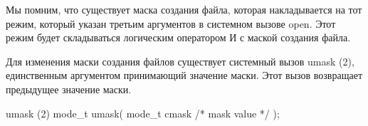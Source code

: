 Мы помним, что существует маска создания файла, которая накладывается на тот режим, который указан третьим аргументов в системном вызове open. Этот режим будет складываться логическим оператором И с маской создания файла. 

Для изменения маски создания файлов существует системный вызов umask (2), единственным аргументом принимающий значение маски. Этот вызов возвращает предыдущее значение маски.

\begin{CCode}{umask (2)}
	mode_t umask( 
		mode_t cmask /* mask value */ 
	); \end{CCode}